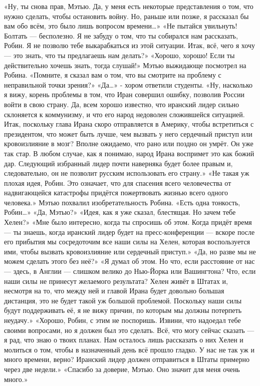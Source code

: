 \documentclass[a4paper,12pt]{book}
\begin{document}
	«Ну, ты снова прав, Мэтью. Да, у меня есть некоторые представления о том, что нужно сделать, чтобы остановить войну. Но, раньше или позже, я рассказал бы вам обо всём, это было лишь вопросом времени…»
	«Не пытайся увильнуть! Болтать — бесполезно. Я не забуду о том, что ты собирался нам рассказать, Робин. Я не позволю тебе выкарабкаться из этой ситуации. Итак, всё, чего я хочу — это знать, что ты предлагаешь нам делать?»
	«Хорошо, хорошо! Если ты действительно хочешь знать, тогда слушай!»
	Мэтью выжидающе посмотрел на Робина.
	«Помните, я сказал вам о том, что вы смотрите на проблему с неправильной точки зрения?»
	«Да…» - хором ответили студенты.
	«Ну, насколько я вижу, корень проблемы в том, что Иран совершил ошибку, позволив России войти в свою страну. Да, всем хорошо известно, что иранский лидер сильно склоняется к коммунизму, и что его народ недоволен сложившейся ситуацией. Итак, поскольку глава Ирана скоро отправляется в Америку, чтобы встретиться с президентом, что может быть лучше, чем вызвать у него сердечный приступ или кровоизлияние в мозг? Вполне ожидаемо, что рано или поздно он умрёт. Он уже так стар. В любом случае, как я понимаю, народ Ирана воспримет это как божий дар. Следующий избранный лидер почти наверняка будет более правым и, следовательно, он не позволит русским использовать его страну.»
	«Не такая уж плохая идея, Робин. Это означает, что для спасения всего человечества от надвигающейся катастрофы придётся пожертвовать жизнью всего одного человека.»
	Мэтью похвалил изобретательность Робина.
	«Есть одна тонкость, Робин…»
	«Да, Мэтью?»
	«Идея, как я уже сказал, блестящая. Но зачем тебе Хелен?»
	«Мне было интересно, когда ты спросишь об этом. Когда придёт время — ты знаешь, когда иранский лидер будет на пресс-конференции — вскоре после его прибытия мы сосредоточим все наши силы на Хелен, которая воспользуется ими, чтобы вызвать кровоизлияние или сердечный приступ.»
	«Да, но разве мы не можем сделать этого без неё?»
	«Я думал об этом. Но что, если расстояние от нас — здесь, в Англии — слишком велико до Нью-Йорка или Вашингтона? Что, если наши силы не принесут желаемого результата? Хелен живёт в Штатах и, несмотря на то, что между ней и главой Ирана будет довольно большая дистанция, это не будет такой уж большой проблемой. Поскольку наши силы будут поддерживать её, я не вижу причин, по которым мы должны потерпеть неудачу.»
	«Хорошо, Робин, с этим не поспоришь. Извини, что надоедал тебе своими вопросами, но я должен был это сделать. Всё, что могу сейчас сказать — я рад, что знаю о твоих планах. Нам осталось лишь рассказать о них Хелен и молиться о том, чтобы в назначенный день всё прошло гладко. У нас не так уж и много времени, верно? Иранский лидер должен отправиться в Штаты примерно через две недели.»
	«Спасибо за доверие, Мэтью. Оно значит для меня очень много.»
\end{document}
